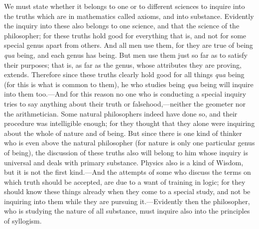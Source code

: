 We must state whether it belongs to one or to different sciences to inquire into the truths which are in mathematics called axioms, and into substance. Evidently the inquiry into these also belongs to one science, and that the science of the philosopher; for these truths hold good for everything that is, and not for some special genus apart from others. And all men use them, for they are true of being \emph{qua} being, and each genus has being. But men use them just so far as to satisfy their purposes; that is, as far as the genus, whose attributes they are proving, extends. Therefore since these truths clearly hold good for all things \emph{qua} being (for this is what is common to them), he who studies being \emph{qua} being will inquire into them too.—And for this reason no one who is conducting a special inquiry tries to say anything about their truth or falsehood,—neither the geometer nor the arithmetician. Some natural philosophers indeed have done so, and their procedure was intelligible enough; for they thought that they alone were inquiring about the whole of nature and of being. But since there is one kind of thinker who is even above the natural philosopher (for nature is only one particular genus of being), the discussion of these truths also will belong to him whose inquiry is universal and deals with primary substance. Physics also is a kind of Wisdom, but it is not the first kind.—And the attempts of some who discuss the terms on which truth should be accepted, are due to a want of training in logic; for they should know these things already when they come to a special study, and not be inquiring into them while they are pursuing it.—Evidently then the philosopher, who is studying the nature of all substance, must inquire also into the principles of syllogism.

